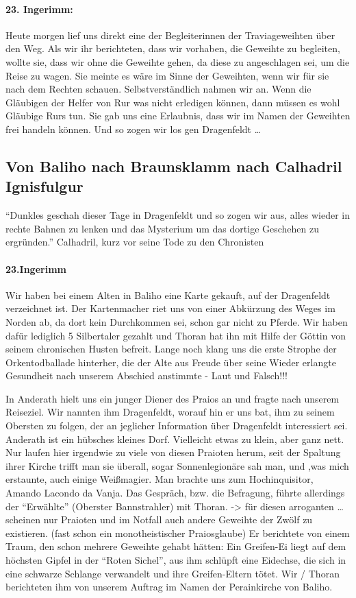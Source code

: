 \paragraph{23. Ingerimm:}
Heute morgen lief uns direkt eine der Begleiterinnen der Traviageweihten über den Weg. Als wir ihr berichteten, dass wir vorhaben, die Geweihte zu begleiten, wollte sie, dass wir ohne die Geweihte gehen, da diese zu angeschlagen sei, um die Reise zu wagen. Sie meinte es wäre im Sinne der Geweihten, wenn wir für sie nach dem Rechten schauen. Selbstverständlich nahmen wir an. Wenn die Gläubigen der Helfer von Rur was nicht erledigen können, dann müssen es wohl Gläubige Rurs tun. Sie gab uns eine Erlaubnis, dass wir im Namen der Geweihten frei handeln können. Und so zogen wir los gen Dragenfeldt \dots


\subsection{Von Baliho nach Braunsklamm nach Calhadril Ignisfulgur}
``Dunkles geschah dieser Tage in Dragenfeldt  und so zogen wir aus, alles wieder in rechte Bahnen zu lenken und das Mysterium um das dortige Geschehen zu ergründen.''
Calhadril, kurz vor seine Tode zu den Chronisten

\paragraph{23.Ingerimm}

Wir haben bei einem Alten in Baliho eine Karte gekauft, auf der Dragenfeldt  verzeichnet ist. Der Kartenmacher riet uns von einer Abkürzung des Weges im Norden ab, da dort kein Durchkommen sei, schon gar nicht zu Pferde. Wir haben dafür lediglich 5 Silbertaler gezahlt und Thoran hat ihn mit Hilfe der Göttin von seinem chronischen Husten befreit. Lange noch klang uns die erste Strophe der Orkentodballade hinterher, die der Alte aus Freude über seine Wieder erlangte Gesundheit nach unserem Abschied anstimmte - Laut und Falsch!!!


In Anderath hielt uns ein junger Diener des Praios an und fragte nach unserem Reiseziel. Wir nannten ihm Dragenfeldt, worauf hin er uns bat, ihm zu seinem Obersten zu folgen, der an jeglicher Information über Dragenfeldt  interessiert sei. Anderath ist ein hübsches kleines Dorf. Vielleicht etwas zu klein, aber ganz nett. Nur laufen hier irgendwie zu viele von diesen Praioten herum, seit der Spaltung ihrer Kirche trifft man sie überall, sogar Sonnenlegionäre sah man, und ,was mich erstaunte, auch einige Weißmagier. Man brachte uns zum Hochinquisitor, Amando Lacondo da Vanja. Das Gespräch, bzw. die Befragung, führte allerdings der ``Erwählte'' (Oberster Bannstrahler) mit Thoran. -> für diesen arroganten \dots scheinen nur Praioten und im Notfall auch andere Geweihte der Zwölf zu existieren. (fast schon ein monotheistischer Praiosglaube) Er berichtete von einem Traum, den schon mehrere Geweihte gehabt hätten: Ein Greifen-Ei liegt auf dem höchsten Gipfel in der ``Roten Sichel'', aus ihm schlüpft eine Eidechse, die sich in eine schwarze Schlange verwandelt und ihre Greifen-Eltern tötet. Wir / Thoran berichteten ihm von unserem Auftrag im Namen der Perainkirche von Baliho. 


